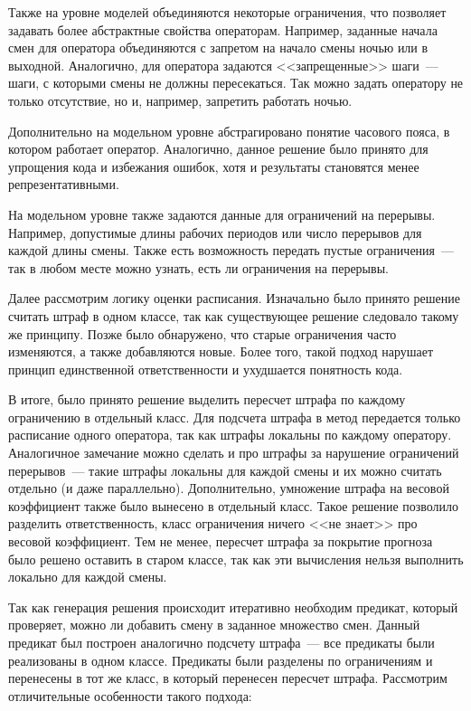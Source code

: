\documentclass[times,specification,annotation]{itmo-student-thesis}
\begin{document}
Также на уровне моделей объединяются некоторые ограничения, что позволяет задавать более абстрактные свойства операторам.
Например, заданные начала смен для оператора объединяются с запретом на начало смены ночью или в выходной.
Аналогично, для оператора задаются <<запрещенные>> шаги~--- шаги, с которыми смены не должны пересекаться.
Так можно задать оператору не только отсутствие, но и, например, запретить работать ночью.

Дополнительно на модельном уровне абстрагировано понятие часового пояса, в котором работает оператор.
Аналогично, данное решение было принято для упрощения кода и избежания ошибок, хотя и результаты становятся менее репрезентативными.

На модельном уровне также задаются данные для ограничений на перерывы.
Например, допустимые длины рабочих периодов или число перерывов для каждой длины смены.
Также есть возможность передать пустые ограничения~--- так в любом месте можно узнать, есть ли ограничения на перерывы.

Далее рассмотрим логику оценки расписания.
Изначально было принято решение считать штраф в одном классе, так как существующее решение следовало такому же принципу.
Позже было обнаружено, что старые ограничения часто изменяются, а также добавляются новые.
Более того, такой подход нарушает принцип единственной ответственности и ухудшается понятность кода.

В итоге, было принято решение выделить пересчет штрафа по каждому ограничению в отдельный класс.
Для подсчета штрафа в метод передается только расписание одного оператора, так как штрафы локальны по каждому оператору.
Аналогичное замечание можно сделать и про штрафы за нарушение ограничений перерывов~--- такие штрафы локальны для каждой смены и их можно считать отдельно (и даже параллельно).
Дополнительно, умножение штрафа на весовой коэффициент также было вынесено в отдельный класс.
Такое решение позволило разделить ответственность, класс ограничения ничего <<не знает>> про весовой коэффициент.
Тем не менее, пересчет штрафа за покрытие прогноза было решено оставить в старом классе, так как эти вычисления нельзя выполнить локально для каждой смены.

Так как генерация решения происходит итеративно необходим предикат, который проверяет, можно ли добавить смену в заданное множество смен.
Данный предикат был построен аналогично подсчету штрафа~--- все предикаты были реализованы в одном классе.
Предикаты были разделены по ограничениям и перенесены в тот же класс, в который перенесен пересчет штрафа.
Рассмотрим отличительные особенности такого подхода:
\end{document}
